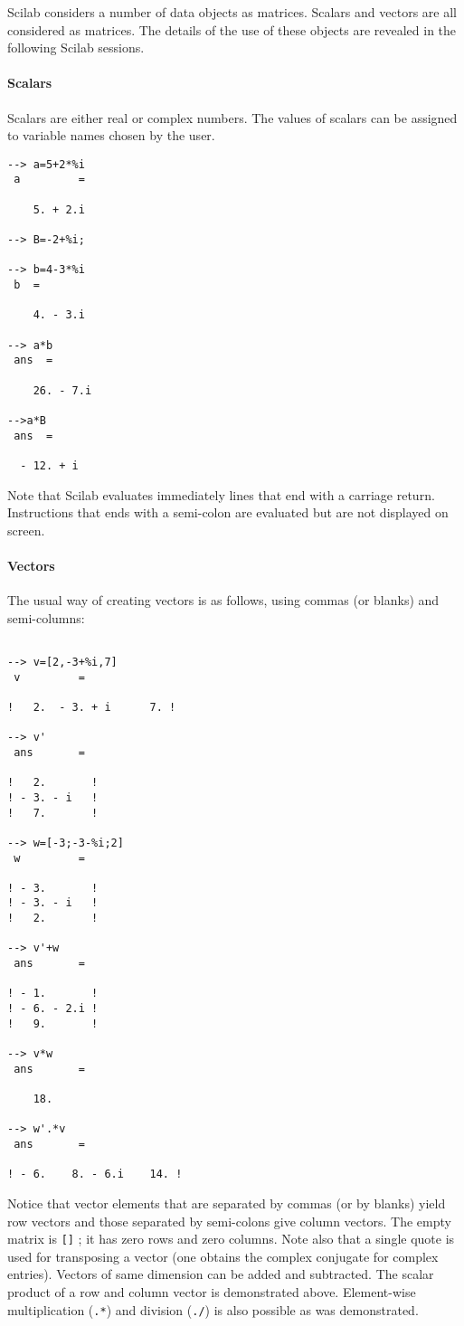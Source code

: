 	Scilab considers a number of data objects as matrices.  
Scalars and  vectors are all considered as matrices.  The details of the use
of these objects are revealed in the following Scilab sessions.

\paragraph{Scalars}
Scalars are either real or complex numbers.  The values of
scalars can be assigned to variable names chosen by the user.
\begin{verbatim}
--> a=5+2*%i
 a         =
 
    5. + 2.i  
 
--> B=-2+%i;

--> b=4-3*%i
 b  =
 
    4. - 3.i 
 
--> a*b
 ans  =
 
    26. - 7.i  
 
-->a*B
 ans  =
 
  - 12. + i    
\end{verbatim}
Note that Scilab evaluates immediately lines that
end with a carriage return.  Instructions that ends with a semi-colon
are evaluated but are not displayed on screen. 

\paragraph{Vectors}
The usual way of creating vectors is as follows, using 
commas (or blanks) and semi-columns:
\begin{verbatim}
 
--> v=[2,-3+%i,7]
 v         =
 
!   2.  - 3. + i      7. !
 
--> v'
 ans       =
 
!   2.       !
! - 3. - i   !
!   7.       !
 
--> w=[-3;-3-%i;2]
 w         =
 
! - 3.       !
! - 3. - i   !
!   2.       !
 
--> v'+w
 ans       =
 
! - 1.       !
! - 6. - 2.i !
!   9.       !
 
--> v*w
 ans       =
 
    18.  
 
--> w'.*v
 ans       =
 
! - 6.    8. - 6.i    14. !
\end{verbatim}
Notice that vector elements that are separated by commas (or by blanks)
yield row vectors and those separated by semi-colons give column
vectors. The empty matrix is \verb![]! ; it has zero rows and zero columns.
Note also that a single quote is used for transposing a 
vector 
(one obtains the complex conjugate for complex entries).  Vectors of same
dimension can be added and subtracted.  The scalar product of a row and
column vector is demonstrated above.  Element-wise
multiplication ({\tt .*}) and division ({\tt ./}) is also possible 
as was demonstrated.

